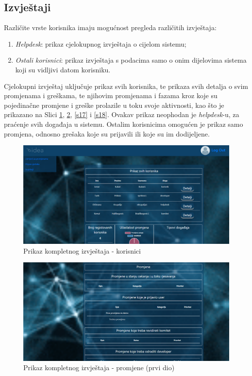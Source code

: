 \documentclass[12pt,a4paper]{article}
\begin{document}
\newpage

\subsection{Izvještaji}

Različite vrste korisnika imaju mogućnost pregleda različitih izvještaja:

\begin{enumerate}
\item \textit{Helpdesk}: prikaz cjelokupnog izvještaja o cijelom sistemu;
\item \textit{Ostali korisnici}: prikaz izvještaja s podacima samo o onim dijelovima sistema koji su vidljivi datom korisniku.
\end{enumerate}

Cjelokupni izvještaj uključuje prikaz svih korisnika, te prikaza svih detalja o svim promjenama i greškama, te njihovim promjenama i fazama kroz koje su pojedinačne promjene i greške prolazile u toku svoje aktivnosti, kao što je prikazano na Slici \ref{s15}, \ref{s16}, \ref{s17} i \ref{s18}. Ovakav prikaz neophodan je \textit{helpdesk}-u, za praćenje svih događaja u sistemu. Ostalim korisnicima omogućen je prikaz samo promjena, odnosno grešaka koje su prijavili ili koje su im dodijeljene.

\begin{figure}[H]
\center
\includegraphics[scale=0.35]{../res/UI/report1.PNG}
\caption{Prikaz kompletnog izvještaja - korisnici}
\label{s15}
\end{figure}

\begin{figure}[H]
\center
\includegraphics[scale=0.35]{../res/UI/report2.PNG}
\caption{Prikaz kompletnog izvještaja - promjene (prvi dio)}
\label{s16}
\end{figure}
\end{document}
